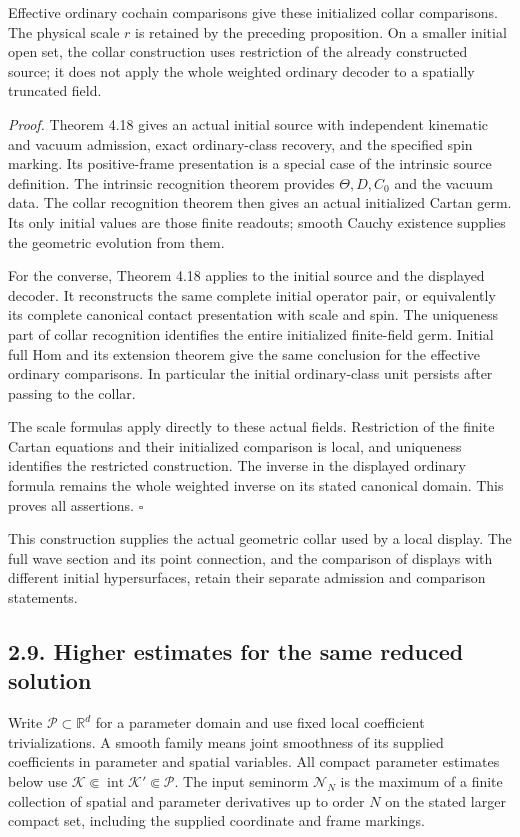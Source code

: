 \documentclass[
  english,
  11pt,
  reqno]{amsart}
\begin{document}
Effective ordinary cochain comparisons give these initialized collar
comparisons. The physical scale \(r\) is retained by the preceding
proposition. On a smaller initial open set, the collar construction uses
restriction of the already constructed source; it does not apply the
whole weighted ordinary decoder to a spatially truncated field.

\emph{Proof.} Theorem 4.18 gives an actual initial source with
independent kinematic and vacuum admission, exact ordinary-class
recovery, and the specified spin marking. Its positive-frame
presentation is a special case of the intrinsic source definition. The
intrinsic recognition theorem provides \(\Theta,D,C_0\) and the vacuum
data. The collar recognition theorem then gives an actual initialized
Cartan germ. Its only initial values are those finite readouts; smooth
Cauchy existence supplies the geometric evolution from them.

For the converse, Theorem 4.18 applies to the initial source and the
displayed decoder. It reconstructs the same complete initial operator
pair, or equivalently its complete canonical contact presentation with
scale and spin. The uniqueness part of collar recognition identifies the
entire initialized finite-field germ. Initial full Hom and its extension
theorem give the same conclusion for the effective ordinary comparisons.
In particular the initial ordinary-class unit persists after passing to
the collar.

The scale formulas apply directly to these actual fields. Restriction of
the finite Cartan equations and their initialized comparison is local,
and uniqueness identifies the restricted construction. The inverse in
the displayed ordinary formula remains the whole weighted inverse on its
stated canonical domain. This proves all assertions. \hfill\(\square\)

This construction supplies the actual geometric collar used by a local
display. The full wave section and its point connection, and the
comparison of displays with different initial hypersurfaces, retain
their separate admission and comparison statements.
\subsection{2.9. Higher estimates for the same reduced
solution}\label{higher-estimates-for-the-same-reduced-solution}\label{sec:online-reduced-family-estimates}

Write \(\mathcal P\subset\mathbb R^d\) for a parameter domain and use
fixed local coefficient trivializations. A smooth family means joint
smoothness of its supplied coefficients in parameter and spatial
variables. All compact parameter estimates below use
\(\mathcal K\Subset\operatorname{int}\mathcal K'\Subset\mathcal P\). The
input seminorm \(\mathcal N_N\) is the maximum of a finite collection of
spatial and parameter derivatives up to order \(N\) on the stated larger
compact set, including the supplied coordinate and frame markings.
\end{document}
